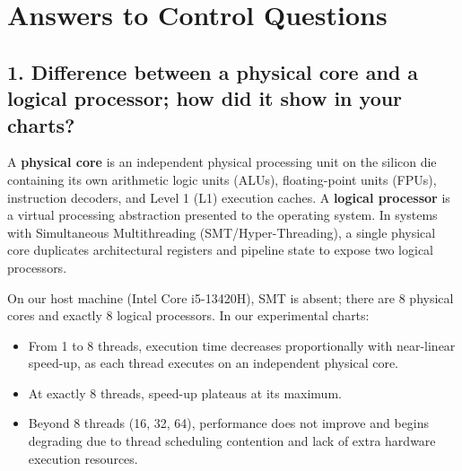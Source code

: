 \documentclass[12pt,a4paper]{article}
\begin{document}
\section{Answers to Control Questions}

\subsection{1. Difference between a physical core and a logical processor; how did it show in your charts?}
A \textbf{physical core} is an independent physical processing unit on the silicon die containing its own arithmetic logic units (ALUs), floating-point units (FPUs), instruction decoders, and Level 1 (L1) execution caches. 
A \textbf{logical processor} is a virtual processing abstraction presented to the operating system. In systems with Simultaneous Multithreading (SMT/Hyper-Threading), a single physical core duplicates architectural registers and pipeline state to expose two logical processors.

On our host machine (Intel Core i5-13420H), SMT is absent; there are 8 physical cores and exactly 8 logical processors. In our experimental charts:
\begin{itemize}
    \item From 1 to 8 threads, execution time decreases proportionally with near-linear speed-up, as each thread executes on an independent physical core.
    \item At exactly 8 threads, speed-up plateaus at its maximum.
    \item Beyond 8 threads (16, 32, 64), performance does not improve and begins degrading due to thread scheduling contention and lack of extra hardware execution resources.
\end{itemize}
\end{document}
